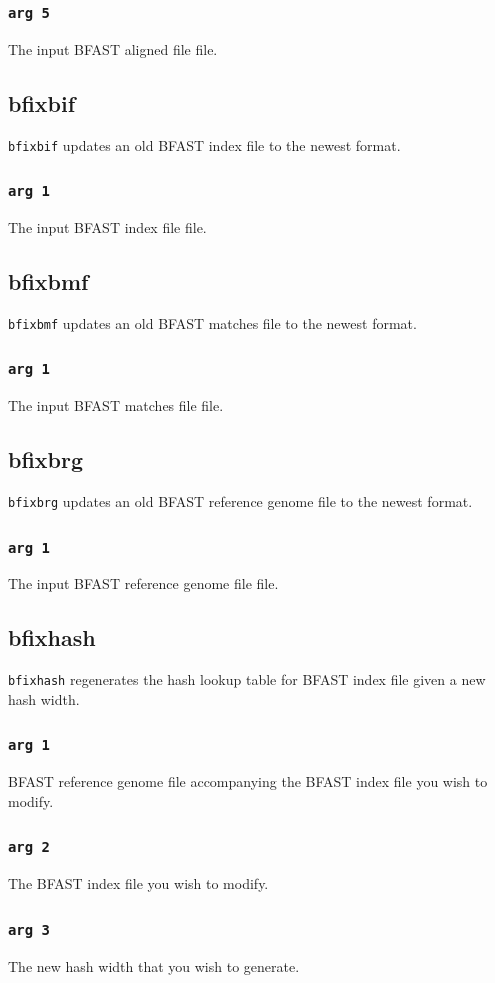 \documentclass[a4paper,12pt]{book}
\newcommand{\TT}[1]{{\tt #1}} %
\newcommand{\BRGF}{BFAST reference genome file} %
\newcommand{\BIF}{BFAST index file} %
\newcommand{\BMF}{BFAST matches file} %
\newcommand{\BAF}{BFAST aligned file} %
\begin{document}
\subsubsection{\TT{arg 5}}
The input \BAF{} file.
\subsection{bfixbif}
\label{sec:bfixbif}
\TT{bfixbif} updates an old \BIF{} to the newest format.
\subsubsection{\TT{arg 1}}
The input \BIF{} file.
\subsection{bfixbmf}
\label{sec:bfixbmf}
\TT{bfixbmf} updates an old \BMF{} to the newest format.
\subsubsection{\TT{arg 1}}
The input \BMF{} file.
\subsection{bfixbrg}
\label{sec:bfixbrg}
\TT{bfixbrg} updates an old \BRGF{} to the newest format.
\subsubsection{\TT{arg 1}}
The input \BRGF{} file.
\subsection{bfixhash}
\label{sec:bfixhash}
\TT{bfixhash} regenerates the hash lookup table for \BIF{} given a new hash width.

\subsubsection{\TT{arg 1}}
\BRGF{} accompanying the \BIF{} you wish to modify.

\subsubsection{\TT{arg 2}}
The \BIF{} you wish to modify.

\subsubsection{\TT{arg 3}}
The new hash width that you wish to generate.
\end{document}
